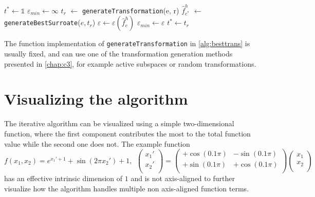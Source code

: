 \documentclass[
  a4paper,  %
  twoside,  %
  bibliography=totoc,
  headsepline,
  cleardoublepage=empty,
  parskip=half,
  draft=false
]{scrbook}
\begin{document}
\newpage

\begin{mdframed}[style=algstyle,frametitle={\textbf{function} \texttt{generateBestTransformation}{$(e, r_{\text{min}} ,r_{\text{max}})$}}]
\normalsize
\vspace{5.5mm}
\begin{algorithmic}[1]
    \State $t^\ast \gets \mathds{1}$
    \State $\varepsilon_{min} \gets \infty$
      \State $t_r$ $\gets$ \texttt{generateTransformation}(e, r)
      \State $\hat{f}_{c^\ast}^h$ $\gets$ \texttt{generateBestSurroate}($e, t_r$)
    	\State $\varepsilon \gets \varepsilon(\hat{f}_c^h)$
    	  \State $\varepsilon_{min}\gets \varepsilon$
    	\State $t^\ast \gets t_r$
    	\EndIf
    \EndFor
    \State {}
\end{algorithmic}
\vspace{-1.5mm}
\delimit
	\label{alg:besttrans}
\end{mdframed}
%
The function implementation of \texttt{generateTransformation} in \cref{alg:besttrans} is usually fixed, and can use one of the transformation generation methods presented in \cref{chap:c3}, for example active subspaces or random transformations.

\section{Visualizing the algorithm}

The iterative algorithm can be visualized using a simple two-dimensional function, where the first component contributes the most to the total function value while the second one does not.
The example function
\begin{equation}
f(x_1, x_2)=e^{x_1' + 1} + \sin(2 \pi x_2') + 1, ~~ \begin{pmatrix}
    x_1' \\ x_2'
    \\
  \end{pmatrix} = \begin{pmatrix}
    +\cos(0.1 \pi) & -\sin(0.1 \pi)\\
    +\sin(0.1 \pi) & +\cos(0.1 \pi)
    \\
  \end{pmatrix}\begin{pmatrix}
    x_1 \\ x_2
    \\
  \end{pmatrix}
\end{equation}
has an effective intrinsic dimension of $1$ and is not axis-aligned to further visualize how the algorithm handles multiple non axis-aligned function terms.
\end{document}

